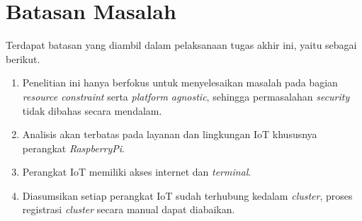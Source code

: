 \section{Batasan Masalah}
\label{sec:batasan-masalah}

Terdapat batasan yang diambil dalam pelaksanaan tugas akhir ini, yaitu sebagai berikut.

\begin{enumerate}
  \item Penelitian ini hanya berfokus untuk menyelesaikan masalah pada bagian \textit{resource constraint} serta \textit{platform agnostic}, sehingga permasalahan \textit{security} tidak dibahas secara mendalam.
  \item Analisis akan terbatas pada layanan dan lingkungan IoT khususnya perangkat \textit{RaspberryPi}.
  \item Perangkat IoT memiliki akses internet dan \textit{terminal}.
  \item Diasumsikan setiap perangkat IoT sudah terhubung kedalam \textit{cluster}, proses registrasi \textit{cluster} secara manual dapat diabaikan.
\end{enumerate}


